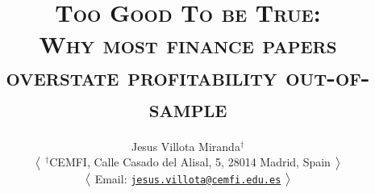 
\title{\textsc{
{\LARGE Too Good To be True: }
\\
{\large Why most finance papers overstate profitability out-of-sample}
}}

\author[1]{
{ \bx \bx \bx Jesus Villota Miranda$^{\dagger}$
}

\bx 
{\small
$\big{<}$
\noindent $^{\dagger}$CEMFI, Calle Casado del Alisal, 5, 28014 Madrid, Spain 
$\big{>}$

$\big{<}$
Email: \href{jesus.villota@cemfi.edu.es}{\texttt{jesus.villota@cemfi.edu.es}}
$\big{>}$
}
}

\date{}  %